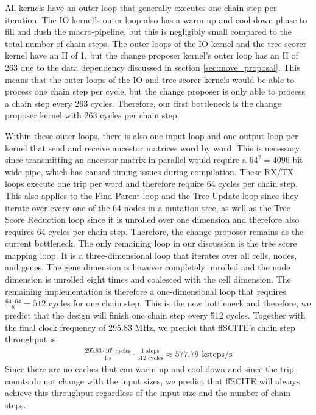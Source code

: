 All kernels have an outer loop that generally executes one chain step per iteration. The IO kernel's outer loop also has a warm-up and cool-down phase to fill and flush the macro-pipeline, but this is negligibly small compared to the total number of chain steps. The outer loops of the IO kernel and the tree scorer kernel have an \ac{II} of 1, but the change proposer kernel's outer loop has an \ac{II} of 263 due to the data dependency discussed in section \ref{sec:move_proposal}. This means that the outer loops of the IO and tree scorer kernels would be able to process one chain step per cycle, but the change proposer is only able to process a chain step every 263 cycles. Therefore, our first bottleneck is the change proposer kernel with 263 cycles per chain step.

Within these outer loops, there is also one input loop and one output loop per kernel that send and receive ancestor matrices word by word. This is necessary since transmitting an ancestor matrix in parallel would require a $64^2 = 4096$-bit wide pipe, which has caused timing issues during compilation. These RX/TX loops execute one trip per word and therefore require 64 cycles per chain step. This also applies to the Find Parent loop and the Tree Update loop since they iterate over every one of the 64 nodes in a mutation tree, as well as the Tree Score Reduction loop since it is unrolled over one dimension and therefore also requires 64 cycles per chain step. Therefore, the change proposer remains as the current bottleneck. The only remaining loop in our discussion is the tree score mapping loop. It is a three-dimensional loop that iterates over all cells, nodes, and genes. The gene dimension is however completely unrolled and the node dimension is unrolled eight times and coalesced with the cell dimension. The remaining implementation is therefore a one-dimensional loop that requires $\frac{64 \cdot 64}{8} = 512$ cycles for one chain step. This is the new bottleneck and therefore, we predict that the design will finish one chain step every 512 cycles. Together with the final clock frequency of 295.83 MHz, we predict that \ac{ffSCITE}'s chain step throughput is
\begin{align*}
    \frac{295.83 \cdot 10^6 \text{ cycles}}{1 \text{ s}} \cdot \frac{1 \text{ steps}}{512 \text{ cycles}} \approx 577.79 \text{ ksteps/s} 
\end{align*}
Since there are no caches that can warm up and cool down and since the trip counts do not change with the input sizes, we predict that \ac{ffSCITE} will always achieve this throughput regardless of the input size and the number of chain steps.